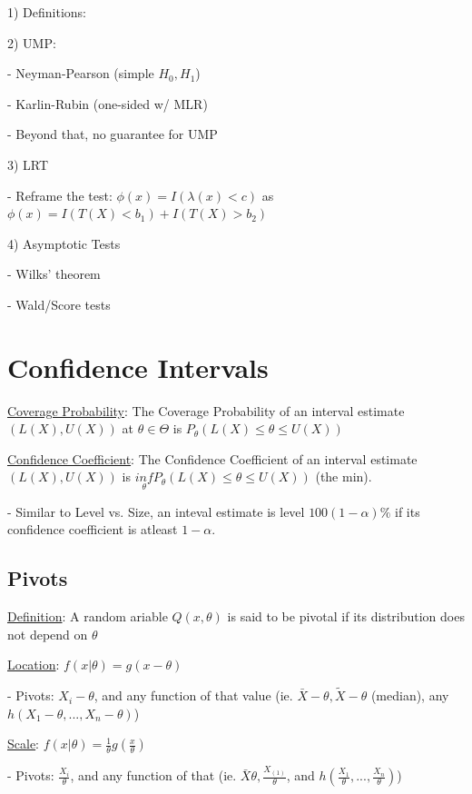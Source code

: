 \documentclass{article}
\begin{document}
1) Definitions: 

2) UMP: 

- Neyman-Pearson (simple $H_0, H_1$)

- Karlin-Rubin (one-sided w/ MLR)

- Beyond that, no guarantee for UMP

3) LRT

- Reframe the test: $\phi(x) = I(\lambda(x) < c)$ as $\phi(x) = I(T(X) < b_1) + I(T(X) > b_2)$

4) Asymptotic Tests

- Wilks' theorem

- Wald/Score tests


\section{Confidence Intervals}

\underline{Coverage Probability}: The Coverage Probability of an interval estimate $(L(X), U(X))$ at $\theta \in \Theta$ is $P_{\theta}(L(X) \le \theta \le U(X))$

\underline{Confidence Coefficient}: The Confidence Coefficient of an interval estimate $(L(X), U(X))$ is $\underset{\theta}{inf} P_{\theta}(L(X) \le \theta \le U(X))$ (the min).

- Similar to Level vs. Size, an inteval estimate is level $100(1-\alpha)\%$ if its confidence coefficient is atleast $1-\alpha$.

\subsection{Pivots}

\underline{Definition}: A random ariable $Q(x, \theta)$ is said to be pivotal if its distribution does not depend on $\theta$

\underline{Location}: $f(x|\theta) = g(x - \theta)$

- Pivots: $X_i - \theta$, and any function of that value (ie. $\bar{X} - \theta, \tilde{X} - \theta$ (median), any $h(X_1-\theta, ..., X_n - \theta)$)

\underline{Scale}: $f(x|\theta) = \frac{1}{\theta}g(\frac{x}{\theta})$

- Pivots: $\frac{X_i}{\theta}$, and any function of that (ie. $\bar{X}\theta, \frac{X_{(1)}}{\theta}$, and $h(\frac{X_1}{\theta}, ..., \frac{X_n}{\theta})$)
\end{document}
